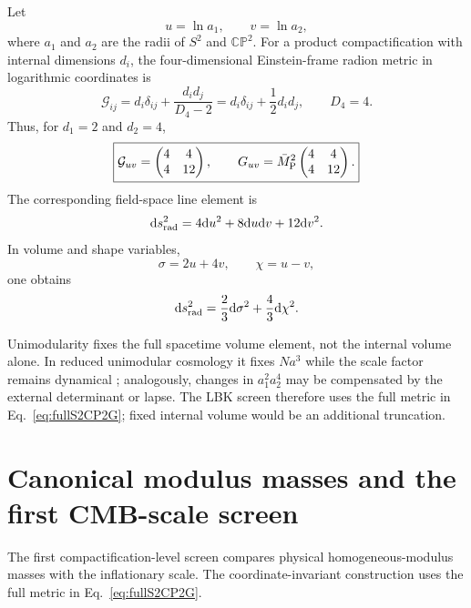 \documentclass[aps,prd,twocolumn,superscriptaddress,nofootinbib,longbibliography,floatfix]{revtex4-2}
\newcommand{\Mpl}{\bar M_{\rm P}}
\newcommand{\dd}{\mathrm d}
\newcommand{\CP}{\mathbb{CP}}
\begin{document}
Let
\begin{equation}
 u=\ln a_1,\qquad v=\ln a_2,
\end{equation}
where $a_1$ and $a_2$ are the radii of $S^2$ and $\CP^2$. For a product compactification with internal dimensions $d_i$, the four-dimensional Einstein-frame radion metric in logarithmic coordinates is
\begin{equation}
\mathcal G_{ij}=d_i\delta_{ij}+\frac{d_i d_j}{D_4-2}
=d_i\delta_{ij}+\frac12 d_i d_j,
\qquad D_4=4 .
\label{eq:generalradionmetric}
\end{equation}
Thus, for $d_1=2$ and $d_2=4$,
\begin{equation}
\boxed{
\mathcal G_{uv}=\begin{pmatrix}4&4\\4&12\end{pmatrix},
\qquad
G_{uv}=\Mpl^2\begin{pmatrix}4&4\\4&12\end{pmatrix}.
}
\label{eq:fullS2CP2G}
\end{equation}
The corresponding field-space line element is
\begin{equation}
\dd s_{\rm rad}^2=4\dd u^2+8\dd u\dd v+12\dd v^2.
\end{equation}
In volume and shape variables,
\begin{equation}
\sigma=2u+4v,\qquad \chi=u-v,
\end{equation}
one obtains
\begin{equation}
\dd s_{\rm rad}^2=\frac23\dd\sigma^2+\frac43\dd\chi^2.
\label{eq:diagvolshape}
\end{equation}

Unimodularity fixes the full spacetime volume element, not the internal volume alone. In reduced unimodular cosmology it fixes $Na^3$ while the scale factor remains dynamical \cite{Yamashita2026UnimodularQC}; analogously, changes in $a_1^2a_2^4$ may be compensated by the external determinant or lapse. The LBK screen therefore uses the full metric in Eq.~\eqref{eq:fullS2CP2G}; fixed internal volume would be an additional truncation.

\section{Canonical modulus masses and the first CMB-scale screen}
\label{app:canonicalmassscreen}
The first compactification-level screen compares physical homogeneous-modulus masses with the inflationary scale. The coordinate-invariant construction uses the full metric in Eq.~\eqref{eq:fullS2CP2G}.
\end{document}

